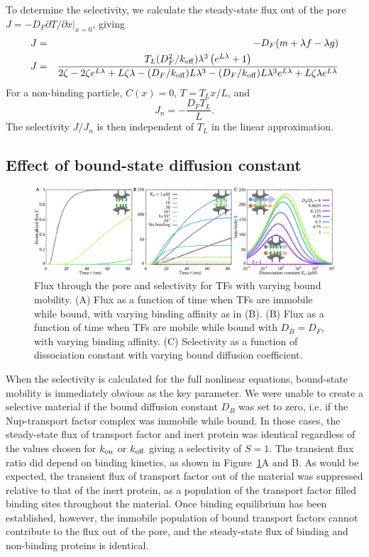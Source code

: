 To determine the selectivity, we calculate the steady-state flux out
of the pore\\ $ J =- D_F \partial T/\partial x|_{x=0}$, giving
\begin{eqnarray}
J& =&-D_F( m + \lambda f - \lambda g) \\
J&=& \frac{{T_L (D_F^2/k_{\rm off}) { \lambda}^3 \left(e^{L  \lambda}
     + 1\right)}}{2 \zeta - 2 \zeta e^{L  \lambda} + L \zeta
     \lambda - (D_F/k_{\rm off}) L  \lambda^3 - (D_F/k_{\rm off}) L  \lambda^3
     e^{L  \lambda} + L \zeta  \lambda e^{L  \lambda}} 
\end{eqnarray}
For a non-binding particle, $C(x) = 0$, $T = T_L x / L$, and
\begin{equation}
  J_n =-\frac{D_F T_L}{L}. 
\end{equation}
The selectivity $J/J_n$ is then independent of $T_L$ in
the linear approximation.

\subsection{Effect of bound-state diffusion constant}

\begin{figure}[t!]
\centering
\includegraphics[width=\textwidth]{figs/ch02/fig2.pdf}
\caption[Flux and selectivity as a function of bound mobility.]{Flux through the pore and selectivity for TFs with varying
  bound mobility. (A) Flux as a function of time when TFs are immobile
  while bound, with varying binding affinity as in (B).  (B) Flux as a function
  of time when TFs are mobile while bound with $D_B = D_F$, with
  varying binding affinity.  (C) Selectivity as a function of
  dissociation constant with varying bound diffusion coefficient. }
\label{fig:transient}
\end{figure}

When the selectivity is calculated for the full nonlinear equations, bound-state mobility is immediately obvious as the key parameter.  We were unable to create a selective material if the bound diffusion constant $D_B$ was set to zero, i.e. if the Nup-transport factor complex was immobile while bound.  In those cases, the steady-state flux of transport factor and inert protein was identical regardless of the values chosen for $k_{\rm on}$ or $k_{\rm off}$ giving a selectivity of $S = 1$.  The transient flux ratio did depend on binding kinetics, as shown in Figure~\ref{fig:transient}A and B.  As would be expected, the transient flux of transport factor out of the material was suppressed relative to that of the inert protein, as a population of the transport factor filled binding sites throughout the material.  Once binding equilibrium has been established, however, the immobile population of bound transport factors cannot contribute to the flux out of the pore, and the steady-state flux of binding and non-binding proteins is identical.


